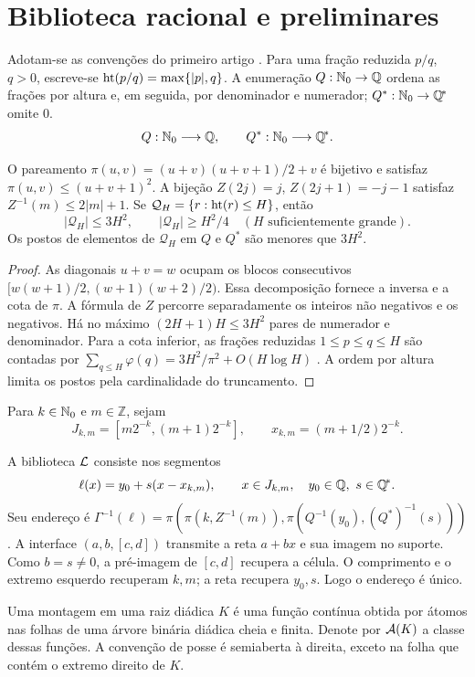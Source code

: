\section{Biblioteca racional e preliminares}
\label{artigo_2:sec:indexing}\label{artigo_2:sec:generator}\label{artigo_2:sec:assemblies}
Adotam-se as convenções do primeiro artigo \citep{artigo_2-oliveiraI}. Para uma fração reduzida $p/q$, $q>0$, escreve-se $\operatorname{ht}(p/q)=\max\{|p|,q\}$. A enumeração $Q:\mathbb{N}_0\to\mathbb Q$ ordena as frações por altura e, em seguida, por denominador e numerador; $Q^*:\mathbb{N}_0\to\mathbb{Q}^{\!*}$ omite $0$.
\begin{equation}
 Q:\mathbb{N}_0\longrightarrow\mathbb Q,\qquad Q^*:\mathbb{N}_0\longrightarrow\mathbb{Q}^{\!*}.
 \label{artigo_2:eq:q-enums}
\end{equation}
\begin{lemma}\label{map:artigo_2:2.1}
\label{artigo_2:lem:cantor}\label{artigo_2:lem:integers}\label{artigo_2:lem:rational-count}\label{artigo_2:lem:rational-rank}
O pareamento $\pi(u,v)=(u+v)(u+v+1)/2+v$ é bijetivo e satisfaz $\pi(u,v)\le(u+v+1)^2$. A bijeção $Z(2j)=j$, $Z(2j+1)=-j-1$ satisfaz $Z^{-1}(m)\le2|m|+1$. Se $\mathcal Q_H=\{r:\operatorname{ht}(r)\le H\}$, então
\[
 |\mathcal Q_H|\le3H^2,\qquad |\mathcal Q_H|\ge H^2/4\quad(H\text{ suficientemente grande}).
\]
Os postos de elementos de $\mathcal Q_H$ em $Q$ e $Q^*$ são menores que $3H^2$.
\end{lemma}
\begin{proof}
As diagonais $u+v=w$ ocupam os blocos consecutivos $[w(w+1)/2,(w+1)(w+2)/2)$. Essa decomposição fornece a inversa e a cota de $\pi$. A fórmula de $Z$ percorre separadamente os inteiros não negativos e os negativos. Há no máximo $(2H+1)H\le3H^2$ pares de numerador e denominador. Para a cota inferior, as frações reduzidas $1\le p\le q\le H$ são contadas por $\sum_{q\le H}\varphi(q)=3H^2/\pi^2+O(H\log H)$ \citep{artigo_1-hardy2008}. A ordem por altura limita os postos pela cardinalidade do truncamento.
\end{proof}

Para $k\in\mathbb{N}_0$ e $m\in\mathbb Z$, sejam
\[
 J_{k,m}=[m2^{-k},(m+1)2^{-k}],\qquad x_{k,m}=(m+1/2)2^{-k}.
\]
\begin{definition}\label{map:artigo_2:2.2}\label{artigo_2:def:assembly}\label{artigo_2:thm:dictionary}\label{artigo_2:lem:cell-recovery}
A biblioteca $\mathcal{L}$ consiste nos segmentos
\[
 \ell(x)=y_0+s(x-x_{k,m}),\qquad x\in J_{k,m},\quad y_0\in\mathbb Q,\ s\in\mathbb{Q}^{\!*}.
\]
Seu endereço é $\Gamma^{-1}(\ell)=\pi(\pi(k,Z^{-1}(m)),\pi(Q^{-1}(y_0),(Q^*)^{-1}(s)))$. A interface $(a,b,[c,d])$ transmite a reta $a+bx$ e sua imagem no suporte. Como $b=s\ne0$, a pré-imagem de $[c,d]$ recupera a célula. O comprimento e o extremo esquerdo recuperam $k,m$; a reta recupera $y_0,s$. Logo o endereço é único.

Uma montagem em uma raiz diádica $K$ é uma função contínua obtida por átomos nas folhas de uma árvore binária diádica cheia e finita. Denote por $\mathcal{A}(K)$ a classe dessas funções. A convenção de posse é semiaberta à direita, exceto na folha que contém o extremo direito de $K$.
\end{definition}

